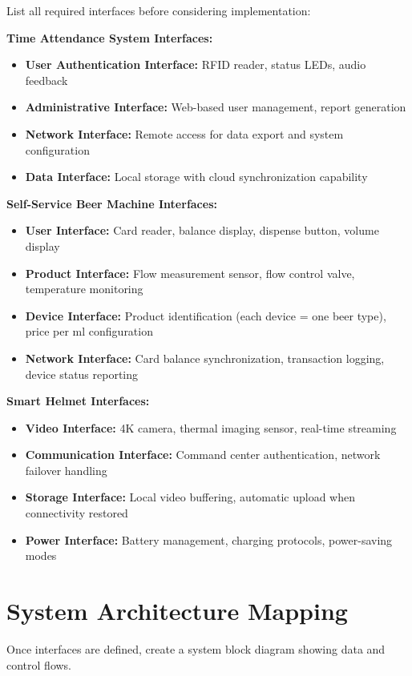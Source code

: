List all required interfaces before considering implementation:

\textbf{Time Attendance System Interfaces:}
\begin{itemize}
\item \textbf{User Authentication Interface:} RFID reader, status LEDs, audio feedback
\item \textbf{Administrative Interface:} Web-based user management, report generation
\item \textbf{Network Interface:} Remote access for data export and system configuration
\item \textbf{Data Interface:} Local storage with cloud synchronization capability
\end{itemize}

\textbf{Self-Service Beer Machine Interfaces:}
\begin{itemize}
\item \textbf{User Interface:} Card reader, balance display, dispense button, volume display
\item \textbf{Product Interface:} Flow measurement sensor, flow control valve, temperature monitoring
\item \textbf{Device Interface:} Product identification (each device = one beer type), price per ml configuration
\item \textbf{Network Interface:} Card balance synchronization, transaction logging, device status reporting
\end{itemize}

\textbf{Smart Helmet Interfaces:}
\begin{itemize}
\item \textbf{Video Interface:} 4K camera, thermal imaging sensor, real-time streaming
\item \textbf{Communication Interface:} Command center authentication, network failover handling
\item \textbf{Storage Interface:} Local video buffering, automatic upload when connectivity restored
\item \textbf{Power Interface:} Battery management, charging protocols, power-saving modes
\end{itemize}

\section{System Architecture Mapping}

Once interfaces are defined, create a system block diagram showing data and control flows.

